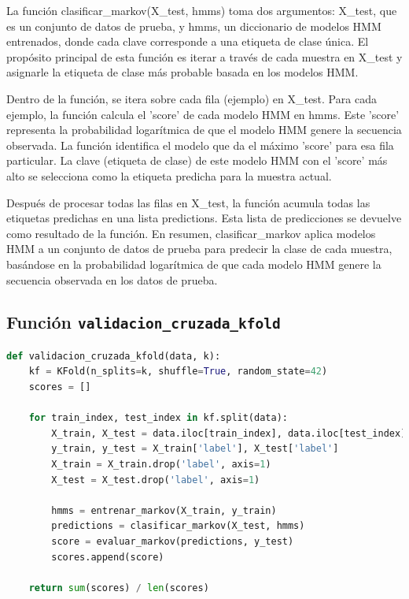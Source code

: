 \documentclass[12pt]{article}
\begin{document}
La función clasificar\_markov(X\_test, hmms) toma dos argumentos: X\_test, que es un conjunto de datos de prueba, y hmms, un diccionario de modelos HMM entrenados, donde cada clave corresponde a una etiqueta de clase única. El propósito principal de esta función es iterar a través de cada muestra en X\_test y asignarle la etiqueta de clase más probable basada en los modelos HMM.\vspace{1cm}


Dentro de la función, se itera sobre cada fila (ejemplo) en X\_test. Para cada ejemplo, la función calcula el 'score' de cada modelo HMM en hmms. Este 'score' representa la probabilidad logarítmica de que el modelo HMM genere la secuencia observada. La función identifica el modelo que da el máximo 'score' para esa fila particular. La clave (etiqueta de clase) de este modelo HMM con el 'score' más alto se selecciona como la etiqueta predicha para la muestra actual.\vspace{1cm}

Después de procesar todas las filas en X\_test, la función acumula todas las etiquetas predichas en una lista predictions. Esta lista de predicciones se devuelve como resultado de la función. En resumen, clasificar\_markov aplica modelos HMM a un conjunto de datos de prueba para predecir la clase de cada muestra, basándose en la probabilidad logarítmica de que cada modelo HMM genere la secuencia observada en los datos de prueba.

\vspace{1cm}

\subsection*{Función \texttt{validacion\_cruzada\_kfold}}
\vspace{1cm}

\begin{lstlisting}[language=Python]
def validacion_cruzada_kfold(data, k):
	kf = KFold(n_splits=k, shuffle=True, random_state=42)
	scores = []
	
	for train_index, test_index in kf.split(data):
		X_train, X_test = data.iloc[train_index], data.iloc[test_index]
		y_train, y_test = X_train['label'], X_test['label']
		X_train = X_train.drop('label', axis=1)
		X_test = X_test.drop('label', axis=1)
		
		hmms = entrenar_markov(X_train, y_train)
		predictions = clasificar_markov(X_test, hmms)
		score = evaluar_markov(predictions, y_test)
		scores.append(score)
	
	return sum(scores) / len(scores)
	
\end{lstlisting}
\vspace{1cm}
\end{document}

